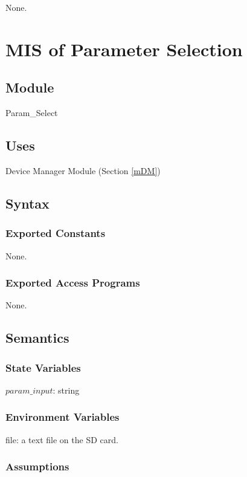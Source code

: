 \documentclass[12pt, titlepage]{article}
\begin{document}
None.
\newpage



\section{MIS of Parameter Selection} \label{mPS} 

\subsection{Module}

Param\_Select

\subsection{Uses}

Device Manager Module (Section \ref{mDM})

\subsection{Syntax}

\subsubsection{Exported Constants}

None.

\subsubsection{Exported Access Programs}

None.

\subsection{Semantics}

\subsubsection{State Variables}

$param\_input$: string

\subsubsection{Environment Variables}

file: a text file on the SD card.

\subsubsection{Assumptions}
\end{document}

